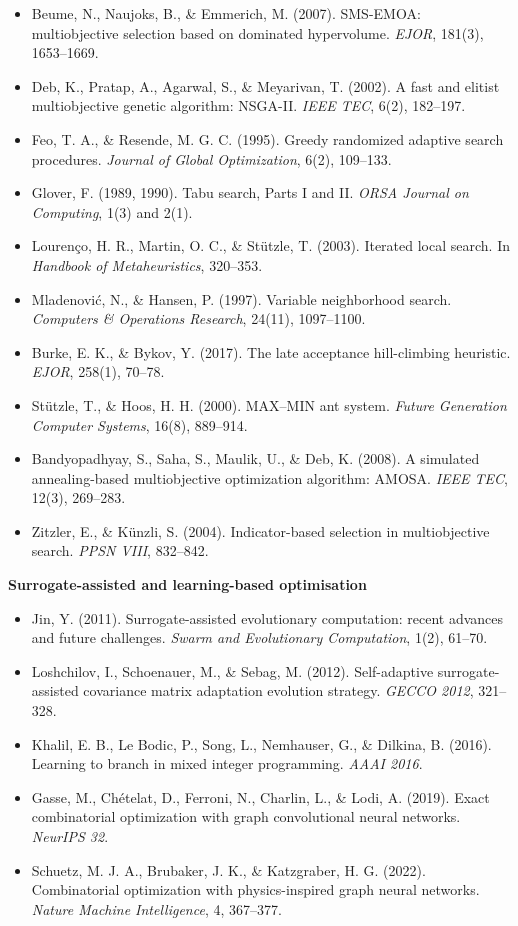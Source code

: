 \documentclass[
  11pt,
]{article}
\providecommand{\tightlist}{%
  \setlength{\itemsep}{0pt}\setlength{\parskip}{0pt}}
\begin{document}
\begin{itemize}
\tightlist
\item
  Beume, N., Naujoks, B., \& Emmerich, M. (2007). SMS-EMOA:
  multiobjective selection based on dominated hypervolume. \emph{EJOR},
  181(3), 1653--1669.
\item
  Deb, K., Pratap, A., Agarwal, S., \& Meyarivan, T. (2002). A fast and
  elitist multiobjective genetic algorithm: NSGA-II. \emph{IEEE TEC},
  6(2), 182--197.
\item
  Feo, T. A., \& Resende, M. G. C. (1995). Greedy randomized adaptive
  search procedures. \emph{Journal of Global Optimization}, 6(2),
  109--133.
\item
  Glover, F. (1989, 1990). Tabu search, Parts I and II. \emph{ORSA
  Journal on Computing}, 1(3) and 2(1).
\item
  Lourenço, H. R., Martin, O. C., \& Stützle, T. (2003). Iterated local
  search. In \emph{Handbook of Metaheuristics}, 320--353.
\item
  Mladenović, N., \& Hansen, P. (1997). Variable neighborhood search.
  \emph{Computers \& Operations Research}, 24(11), 1097--1100.
\item
  Burke, E. K., \& Bykov, Y. (2017). The late acceptance hill-climbing
  heuristic. \emph{EJOR}, 258(1), 70--78.
\item
  Stützle, T., \& Hoos, H. H. (2000). MAX--MIN ant system. \emph{Future
  Generation Computer Systems}, 16(8), 889--914.
\item
  Bandyopadhyay, S., Saha, S., Maulik, U., \& Deb, K. (2008). A
  simulated annealing-based multiobjective optimization algorithm:
  AMOSA. \emph{IEEE TEC}, 12(3), 269--283.
\item
  Zitzler, E., \& Künzli, S. (2004). Indicator-based selection in
  multiobjective search. \emph{PPSN VIII}, 832--842.
\end{itemize}

\textbf{Surrogate-assisted and learning-based optimisation}

\begin{itemize}
\tightlist
\item
  Jin, Y. (2011). Surrogate-assisted evolutionary computation: recent
  advances and future challenges. \emph{Swarm and Evolutionary
  Computation}, 1(2), 61--70.
\item
  Loshchilov, I., Schoenauer, M., \& Sebag, M. (2012). Self-adaptive
  surrogate-assisted covariance matrix adaptation evolution strategy.
  \emph{GECCO 2012}, 321--328.
\item
  Khalil, E. B., Le Bodic, P., Song, L., Nemhauser, G., \& Dilkina, B.
  (2016). Learning to branch in mixed integer programming. \emph{AAAI
  2016}.
\item
  Gasse, M., Chételat, D., Ferroni, N., Charlin, L., \& Lodi, A. (2019).
  Exact combinatorial optimization with graph convolutional neural
  networks. \emph{NeurIPS 32}.
\item
  Schuetz, M. J. A., Brubaker, J. K., \& Katzgraber, H. G. (2022).
  Combinatorial optimization with physics-inspired graph neural
  networks. \emph{Nature Machine Intelligence}, 4, 367--377.
\end{itemize}
\end{document}
